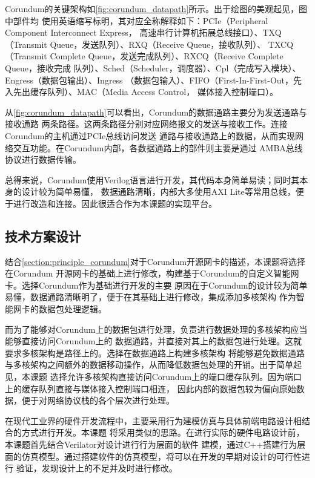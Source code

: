 Corundum的关键架构如\autoref{fig:corundum_datapath}所示。出于绘图的美观起见，图中部件均
使用英语缩写标明，其对应全称解释如下：PCIe（Peripheral Component Interconnect Express，
高速串行计算机拓展总线接口）、TXQ（Transmit Queue，发送队列）、RXQ（Receive Queue，接收队列）、
TXCQ（Transmit Complete Queue，发送完成队列）、RXCQ（Receive Complete Queue，接收完成
队列）、Sched（Scheduler，调度器）、Cpl（完成写入模块）、Engress（数据包输出）、Ingress
（数据包输入）、FIFO（First-In-First-Out，先入先出缓存队列）、MAC（Media Access Control，
媒体接入控制端口）。


从\autoref{fig:corundum_datapath}可以看出，Corundum的数据通路主要分为发送通路与接收通路
两条路径。这两条路径分别对应网络报文的发送与接收工作。连接Corundum的主机通过PCIe总线访问发送
通路与接收通路上的数据，从而实现网络交互功能。在Corundum内部，各数据通路上的部件则主要是通过
AMBA总线协议\cite{arm2011axi}进行数据传输。

总得来说，Corundum使用Verilog语言进行开发，其代码本身简单易读；同时其本身的设计较为简单易懂，
数据通路清晰，内部大多使用AXI Lite等常用总线，便于进行改造和连接。因此很适合作为本课题的实现平台。

\subsection{技术方案设计}
\label{section:principle_basicpath}


结合\autoref{section:principle_corundum}对于Corundum开源网卡的描述，本课题将选择在Corundum
开源网卡的基础上进行修改，构建基于Corundum的自定义智能网卡。选择Corundum作为基础进行开发的主要
原因在于Corundum的设计较为简单易懂，数据通路清晰明了，便于在其基础上进行修改，集成添加多核架构
作为智能网卡的数据包处理逻辑。

而为了能够对Corundum上的数据包进行处理，负责进行数据处理的多核架构应当能够直接访问Corundum上的
数据通路，并直接对其上的数据包进行处理。这就要求多核架构是路径上的。选择在数据通路上构建多核架构
将能够避免数据通路与多核架构之间额外的数据移动操作，从而降低数据包处理的开销。出于简单起见，本课题
选择允许多核架构直接访问Corundum上的端口缓存队列。因为端口上的缓存队列直接与媒体接入控制端口相连，
因此内部的数据包较为偏向原始数据，便于对网络协议栈的各个层次进行处理。

在现代工业界的硬件开发流程中，主要采用行为建模仿真与具体前端电路设计相结合的方式进行开发。本课题
将采用类似的思路。在进行实际的硬件电路设计前，本课题首先结合Verilator对设计进行行为层面的软件
建模，通过C++搭建行为层面的仿真模型。通过搭建软件的仿真模型，将可以在开发的早期对设计的可行性进行
验证，发现设计上的不足并及时进行修改。

